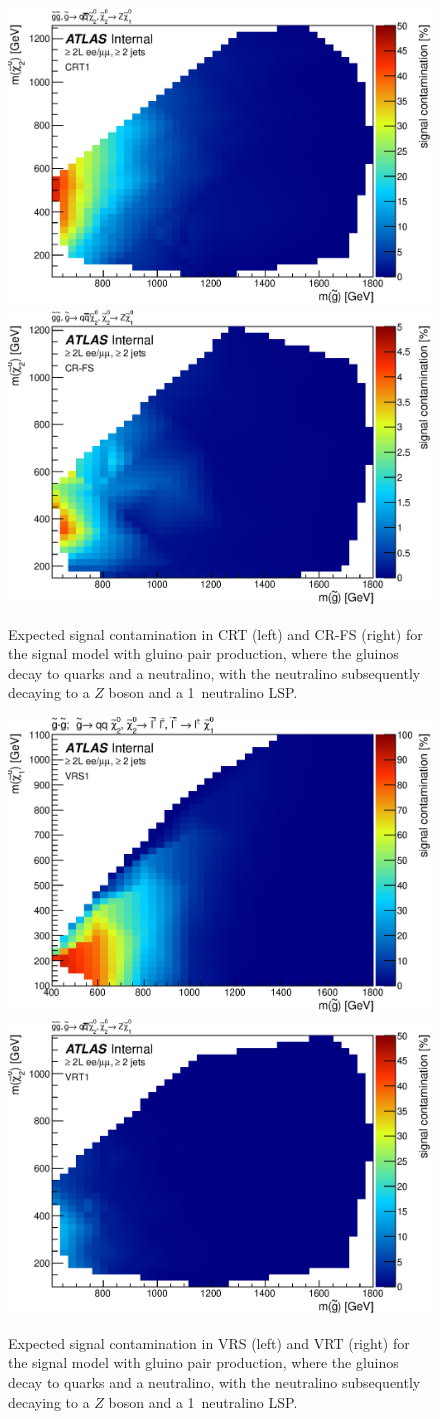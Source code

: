 \begin{figure}[ht]
\centering
\includegraphics[width=.48\textwidth]{figures/signalacceptcontam/cont_SM_GG_N2_1_CRT1.eps}
\includegraphics[width=.48\textwidth]{figures/signalacceptcontam/cont_SM_GG_N2_1_CR-FS.eps}
\caption{
Expected signal contamination in CRT (left) and CR-FS (right) for the signal model with gluino pair production, where the gluinos decay to quarks and a neutralino, 
with the neutralino subsequently decaying to a $Z$ boson and a 1\gev~neutralino LSP.}
\label{fig:sig_contam_CRT}
\end{figure}

\begin{figure}[ht]
\centering
\includegraphics[width=.48\textwidth]{figures/signalacceptcontam/cont_SM_GG_N2_1_VRS1.eps}
\includegraphics[width=.48\textwidth]{figures/signalacceptcontam/cont_SM_GG_N2_1_VRT1.eps}
\caption{
Expected signal contamination in VRS (left) and VRT (right) for the signal model with gluino pair production, where the gluinos decay to quarks and a neutralino, 
with the neutralino subsequently decaying to a $Z$ boson and a 1\gev~neutralino LSP.}
\label{fig:sig_contam_VR}
\end{figure}

